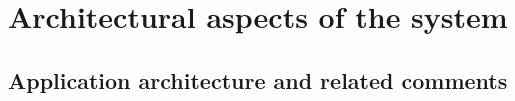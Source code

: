 \chapter{Architectural aspects of the system}\label{ch:architectural-aspects-of-the-system}


\section{Application architecture and related comments}\label{sec:application-architecture-and-related-comments}



